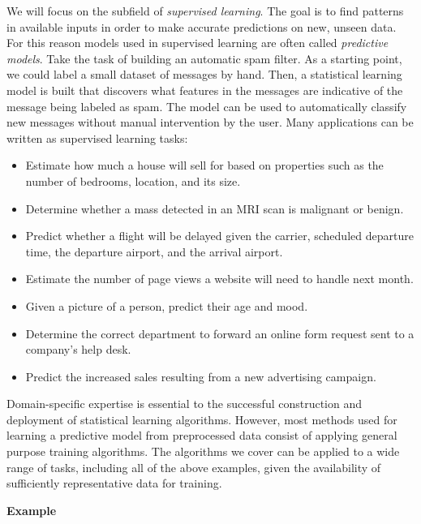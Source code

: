 \documentclass[12pt,hidelinks]{article}
\numberwithin{equation}{section}
\begin{document}
We will focus on the subfield of \textit{supervised learning}.
The goal is to find patterns in available
inputs in order to make accurate predictions on new, unseen data. For this
reason models used in supervised learning are often called \textit{predictive
models}. Take the task of building an automatic spam filter.
As a starting point, we could label a small dataset of messages by hand. Then,
a statistical learning model is built that discovers what features in the
messages are indicative of the message being labeled as spam. The model can
be used to automatically classify new messages without manual
intervention by the user. Many applications can be written as supervised
learning tasks:
\begin{itemize}
\item Estimate how much a house will sell for based on properties such as the
number of bedrooms, location, and its size.
\item Determine whether a mass detected in an MRI scan is malignant or benign.
\item Predict whether a flight will be delayed given the carrier, scheduled
departure time, the departure airport, and the arrival airport.
\item Estimate the number of page views a website will need to handle next
month.
\item Given a picture of a person, predict their age and mood.
\item Determine the correct department to forward an online form request sent
to a company's help desk.
\item Predict the increased sales resulting from a new advertising campaign.
\end{itemize}
Domain-specific expertise is essential to the successful construction and
deployment of statistical learning algorithms. However, most methods used for
learning a predictive model from preprocessed data consist of applying
general purpose training algorithms. The algorithms we cover can
be applied to a wide range of tasks, including all of the above examples,
given the availability of sufficiently representative data for training.

\vspace{12pt}
\textbf{Example} \label{sec_slearn_intro}
\end{document}
